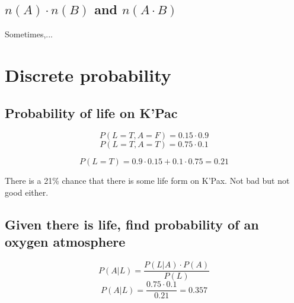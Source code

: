 \documentclass[12pt]{article}
\begin{document}
\subsection{$n(A) \cdot n(B)$ and $n(A \cdot B)$}

Sometimes,...

\section{Discrete probability}

\subsection{Probability of life on K'Pac}

\[P(L=T, A=F) = 0.15 \cdot 0.9\]
\[P(L=T, A=T) = 0.75 \cdot 0.1\]

\[P(L=T)=0.9 \cdot 0.15 + 0.1 \cdot 0.75 = 0.21\]

There is a 21\% chance that there is some life form on K'Pax. Not bad but not good either.





\subsection{Given there is life, find probability of an oxygen atmosphere}

\[P(A|L) = \frac{P(L | A) \cdot P(A)}{P(L)}\]
\[P(A|L) = \frac{0.75 \cdot 0.1}{0.21} = 0.357\]
\end{document}
